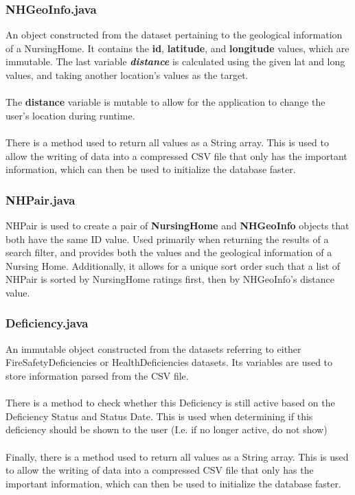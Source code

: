 \documentclass[12pt]{article}
\begin{document}
\subsubsection{NHGeoInfo.java}
An object constructed from the dataset pertaining to the geological information of a NursingHome. It contains the \textbf{id}, \textbf{latitude}, and \textbf{longitude} values, which are immutable. The last variable \textit{\textbf{distance}} is calculated using the given lat and long values, and taking another location's values as the target. \\ \\ 
The \textbf{distance} variable is mutable to allow for the application to change the user's location during runtime. \\ \\
There is a method used to return all values as a String array. This is used to allow the writing of data into a compressed CSV file that only has the important information, which can then be used to initialize the database faster.

\subsubsection{NHPair.java}
NHPair is used to create a pair of \textbf{NursingHome} and \textbf{NHGeoInfo} objects that both have the same ID value. Used primarily when returning the results of a search filter, and provides both the values and the geological information of a Nursing Home. Additionally, it allows for a unique sort order such that a list of NHPair is sorted by NursingHome ratings first, then by NHGeoInfo's distance value.

\subsubsection{Deficiency.java}
An immutable object constructed from the datasets referring to either FireSafetyDeficiencies or HealthDeficiencies datasets. Its variables are used to store information parsed from the CSV file. \\ \\
There is a method to check whether this Deficiency is still active based on the Deficiency Status and Status Date. This is used when determining if this deficiency should be shown to the user (I.e. if no longer active, do not show) \\ \\
Finally, there is a method used to return all values as a String array. This is used to allow the writing of data into a compressed CSV file that only has the important information, which can then be used to initialize the database faster. 
\end{document}
